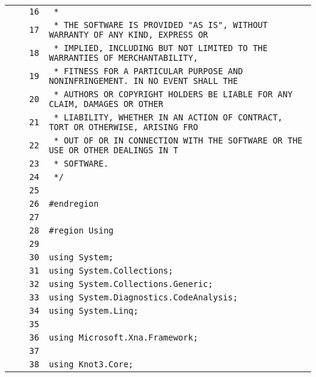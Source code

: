 \documentclass[a4paper,10pt]{article}
\begin{document}
\begin{longtable}[l]{lrrl}
\cellcolor{gray} &  & \verb~16~ & \verb~ *~\\
\cellcolor{gray} &  & \verb~17~ & \verb~ * THE SOFTWARE IS PROVIDED "AS IS", WITHOUT WARRANTY OF ANY KIND, EXPRESS OR~\\
\cellcolor{gray} &  & \verb~18~ & \verb~ * IMPLIED, INCLUDING BUT NOT LIMITED TO THE WARRANTIES OF MERCHANTABILITY,~\\
\cellcolor{gray} &  & \verb~19~ & \verb~ * FITNESS FOR A PARTICULAR PURPOSE AND NONINFRINGEMENT. IN NO EVENT SHALL THE~\\
\cellcolor{gray} &  & \verb~20~ & \verb~ * AUTHORS OR COPYRIGHT HOLDERS BE LIABLE FOR ANY CLAIM, DAMAGES OR OTHER~\\
\cellcolor{gray} &  & \verb~21~ & \verb~ * LIABILITY, WHETHER IN AN ACTION OF CONTRACT, TORT OR OTHERWISE, ARISING FRO~\\
\cellcolor{gray} &  & \verb~22~ & \verb~ * OUT OF OR IN CONNECTION WITH THE SOFTWARE OR THE USE OR OTHER DEALINGS IN T~\\
\cellcolor{gray} &  & \verb~23~ & \verb~ * SOFTWARE.~\\
\cellcolor{gray} &  & \verb~24~ & \verb~ */~\\
\cellcolor{gray} &  & \verb~25~ & \verb~~\\
\cellcolor{gray} &  & \verb~26~ & \verb~#endregion~\\
\cellcolor{gray} &  & \verb~27~ & \verb~~\\
\cellcolor{gray} &  & \verb~28~ & \verb~#region Using~\\
\cellcolor{gray} &  & \verb~29~ & \verb~~\\
\cellcolor{gray} &  & \verb~30~ & \verb~using System;~\\
\cellcolor{gray} &  & \verb~31~ & \verb~using System.Collections;~\\
\cellcolor{gray} &  & \verb~32~ & \verb~using System.Collections.Generic;~\\
\cellcolor{gray} &  & \verb~33~ & \verb~using System.Diagnostics.CodeAnalysis;~\\
\cellcolor{gray} &  & \verb~34~ & \verb~using System.Linq;~\\
\cellcolor{gray} &  & \verb~35~ & \verb~~\\
\cellcolor{gray} &  & \verb~36~ & \verb~using Microsoft.Xna.Framework;~\\
\cellcolor{gray} &  & \verb~37~ & \verb~~\\
\cellcolor{gray} &  & \verb~38~ & \verb~using Knot3.Core;~\\

\end{longtable}
\end{document}

